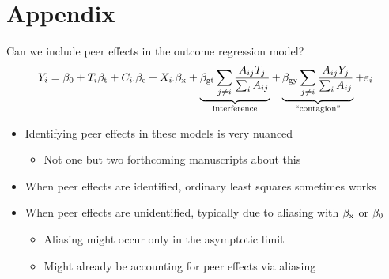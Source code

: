 \documentclass[aspectratio=169]{beamer}
\theoremstyle{remark}
\begin{document}
\section{Appendix}
\appendix


\begin{frame}{Can we include peer effects in the outcome regression model?}
    \begin{equation*}
        \begin{aligned}
            Y_i
            = \beta_0 + T_i \beta_\text{t} + C_{i \cdot} \beta_\text{c} + X_{i \cdot} \beta_\text{x} +
            \underbrace{\beta_\text{gt} \sum_{j \neq i} \frac{A_{ij} T_j}{\sum_i A_{ij}}}_\text{interference} +
            \underbrace{\beta_\text{gy} \sum_{j \neq i} \frac{A_{ij} Y_j}{\sum_i A_{ij}}}_\text{``contagion''} +
            \varepsilon_i
        \end{aligned}
    \end{equation*}
    \begin{itemize}
        \item Identifying peer effects in these models is very nuanced
              \begin{itemize}
                  \item Not one but two forthcoming manuscripts about this
              \end{itemize}
        \item When peer effects are identified, ordinary least squares sometimes works
        \item When peer effects are unidentified, typically due to aliasing with $\beta_\text{x}$ or $\beta_0$
              \begin{itemize}
                  \item Aliasing might occur only in the asymptotic limit
                  \item Might already be accounting for peer effects via aliasing
              \end{itemize}
    \end{itemize}
\end{frame}
\end{document}
